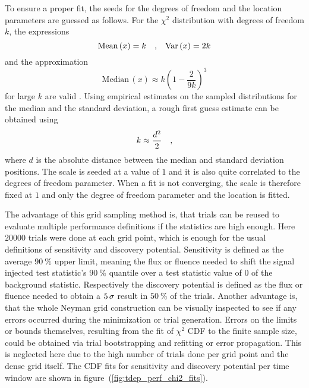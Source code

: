 To ensure a proper fit, the seeds for the degrees of freedom and the location parameters are guessed as follows.
For the $\chi^2$ distribution with degrees of freedom $k$, the expressions
\begin{equation}
  \text{Mean}\,(x) = k \quad\text{,}\quad
  \text{Var}\,(x) = 2k
\end{equation}
and the approximation
\begin{equation}
    \text{Median}\,(x) \approx k \left(1 - \frac{2}{9k}\right)^3
\end{equation}
for large $k$ are valid \cite{blobel2013statistische,Abramowitz:1974handbook}.
Using empirical estimates on the sampled distributions for the median and the standard deviation, a rough first guess estimate can be obtained using
\begin{equation}
  k \approx \frac{d^2}{2}
  \quad\text{,}
\end{equation}
where $d$ is the absolute distance between the median and standard deviation positions.
The scale is seeded at a value of $1$ and it is also quite correlated to the degrees of freedom parameter.
When a fit is not converging, the scale is therefore fixed at $1$ and only the degree of freedom parameter and the location is fitted.

The advantage of this grid sampling method is, that trials can be reused to evaluate multiple performance definitions if the statistics are high enough.
Here $\num{20000}$ trials were done at each grid point, which is enough for the usual definitions of sensitivity and discovery potential.
Sensitivity is defined as the average $\SI{90}{\percent}$ upper limit, meaning the flux or fluence needed to shift the signal injected test statistic's $\SI{90}{\percent}$ quantile over a test statistic value of $0$ of the background statistic.
Respectively the discovery potential is defined as the flux or fluence needed to obtain a $\num{5}\,\sigma$ result in $\SI{50}{\percent}$ of the trials.
Another advantage is, that the whole Neyman grid construction can be visually inspected to see if any errors occurred during the minimization or trial generation.
Errors on the limits or bounds themselves, resulting from the fit of $\chi^2$ CDF to the finite sample size, could be obtained via trial bootstrapping and refitting or error propagation.
This is neglected here due to the high number of trials done per grid point and the dense grid itself.
The CDF fits for sensitivity and discovery potential per time window are shown in figure~(\ref{fig:tdep_perf_chi2_fits}).

